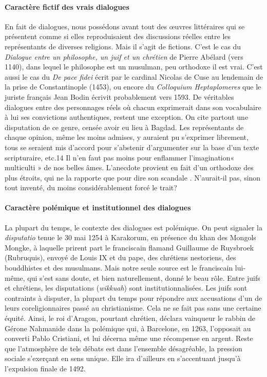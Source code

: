 \paragraph{Caractère fictif des vrais dialogues}
En fait de dialogues, nous possédons avant tout des œuvres littéraires qui se présentent comme si elles reproduisaient des discussions réelles entre les représentants de diverses religions. Mais il s'agit de fictions. C'est le cas du \textit{Dialogue entre un philosophe, un juif et un chrétien} de Pierre Abélard (vers 1140), dans lequel le philosophe est un musulman, peu orthodoxe il est vrai. C'est aussi le cas du \textit{De pace fidei} écrit par le cardinal Nicolas de Cuse au lendemain de la prise de Constantinople (1453), ou encore du \textit{Colloquium Heptaplomeres} que le juriste français Jean Bodin écrivit probablement vers 1593.
De véritables dialogues entre des personnages réels où chacun exprimerait dans son vocabulaire à lui ses convictions authentiques, restent une exception. On cite partout une disputation de ce genre, censée avoir eu lieu à Bagdad. Les représentants de chaque opinion, même les moins admises, y auraient pu s'exprimer librement, tous se seraient mis d'accord pour s'abstenir d'argumenter sur la base d'un texte scripturaire, etc.14 Il n'en faut pas moins pour enflammer l'imagination« multiculti » de nos belles âmes. L'anecdote provient en fait d'un orthodoxe des plus étroits, qui ne la rapporte que pour
dire son scandale . N'aurait-il pas, sinon tout inventé, du moins considérablement forcé le trait?

\paragraph{Caractère polémique et institutionnel des dialogues}
La plupart du temps, le contexte des dialogues est polémique. On peut signaler la \textit{disputatio} tenue le 30 mai 1254 à Karakorum, en présence du khan des Mongols Mongke, à laquelle prirent part le franciscain flamand Guillaume de Ruysbroek (Rubruquis), envoyé de Louis IX et du pape, des chrétiens nestoriens, des bouddhistes et des musulmans. Mais notre seule source est le franciscain lui-même, qui s'est sans doute, et bien naturellement, donné le beau rôle.
Entre juifs et chrétiens, les disputations (\textit{wikkuah}) sont institutionnalisées. Les juifs sont contraints à disputer, la plupart du temps pour répondre aux accusations d'un de leurs coreligionnaires passé au christianisme. Cela ne se fait pas sans une certaine équité. Ainsi, le roi d'Aragon, pourtant chrétien, déclara vainqueur le rabbin de Gérone Nahmanide dans la polémique qui, à Barcelone, en 1263, l'opposait au converti Pablo Cristiani, et lui décerna même une récompense en argent. Reste que l'atmosphère de tels débats est dans l'ensemble désagréable, la pression sociale s'exerçant en sens unique. Elle ira d'ailleurs en s'accentuant jusqu'à l'expulsion finale de 1492.

